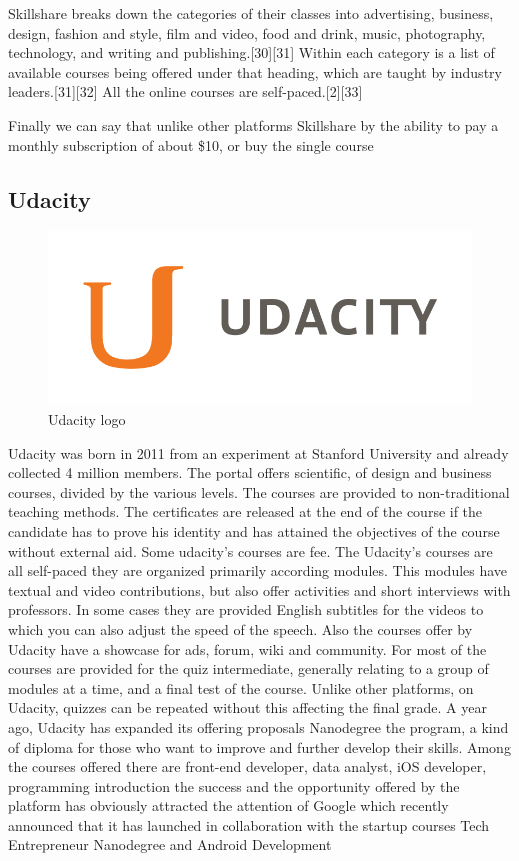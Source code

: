 Skillshare breaks down the categories of their classes into advertising, business, design, fashion and style, film and video, food and drink, music, photography, technology, and writing and publishing.[30][31] Within each category is a list of available courses being offered under that heading, which are taught by industry leaders.[31][32] All the online courses are self-paced.[2][33]

Finally we can say that unlike other platforms Skillshare by the ability to pay a monthly subscription of about \$10, or buy the single course


\subsection{Udacity}
\label{subsec:udacity}
\begin{figure}[htb] %
 \centering
 \includegraphics[width=0.5\linewidth]{images/chapter1/udacity.png}\hfill
 \caption[Udacity logo]{Udacity logo}
 \label{fig:fourV}
\end{figure}

Udacity was born in 2011 from an experiment at Stanford University and already collected 4 million members. The portal offers scientific, of design and business courses, divided by the various levels. The courses are provided to non-traditional teaching methods.
The certificates are released at the end of the course if the candidate has to prove his identity and has attained the objectives of the course without external aid. Some udacity's courses are fee.
The Udacity’s courses are all self-paced they are organized primarily according modules. This modules have textual and video contributions, but also offer activities and short interviews with professors. In some cases they are provided English subtitles for the videos to which you can also adjust the speed of the speech.
Also the courses offer by Udacity have a showcase for ads, forum, wiki and community. For most of the courses are provided for the quiz intermediate, generally relating to a group of modules at a time, and a final test of the course. Unlike other platforms, on Udacity, quizzes can be repeated without this affecting the final grade.
A year ago, Udacity has expanded its offering proposals Nanodegree the program, a kind of diploma for those who want to improve and further develop their skills. Among the courses offered there are front-end developer, data analyst, iOS developer, programming introduction
the success and the opportunity offered by the platform has obviously attracted the attention of Google which recently announced that it has launched in collaboration with the startup courses Tech Entrepreneur Nanodegree and Android Development

